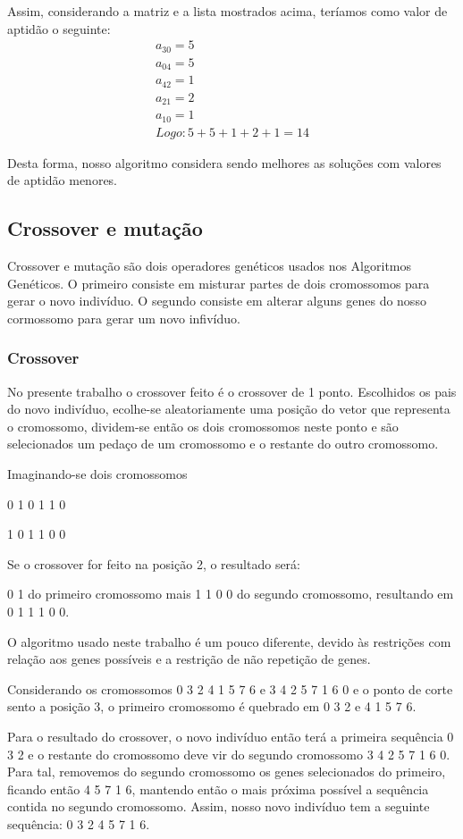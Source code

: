 \documentclass[a4paper,12pt]{article}
\begin{document}
  Assim, considerando a matriz e a lista mostrados acima, teríamos como valor de
  aptidão o seguinte:
  \begin{align*}
    a_{30}=5 \\
    a_{04}=5 \\
    a_{42}=1 \\
    a_{21}=2 \\
    a_{10}=1 \\
    Logo: 5+5+1+2+1 = 14
  \end{align*}

  Desta forma, nosso algoritmo considera sendo melhores as soluções com valores
  de aptidão menores.

  \subsection{Crossover e mutação}
  Crossover e mutação são dois operadores genéticos usados nos Algoritmos
  Genéticos. O primeiro consiste em misturar partes de dois cromossomos para
  gerar o novo indivíduo. O segundo consiste em alterar alguns genes do nosso
  cormossomo para gerar um novo infivíduo.

  \subsubsection{Crossover}
  No presente trabalho o crossover feito é o crossover de 1 ponto.
  Escolhidos os pais do novo indivíduo, ecolhe-se aleatoriamente uma posição do
  vetor que representa o cromossomo, dividem-se então os dois cromossomos neste
  ponto e são selecionados um pedaço de um cromossomo e o restante do outro
  cromossomo.

  Imaginando-se dois cromossomos

  0 1 0 1 1 0

  1 0 1 1 0 0

  Se o crossover for feito na posição 2, o resultado será:

  0 1 do primeiro cromossomo mais 1 1 0 0 do segundo cromossomo, resultando
  em 0 1 1 1 0 0.

  O algoritmo usado neste trabalho é um pouco diferente, devido às restrições com relação aos genes
  possíveis e a restrição de não repetição de genes.

  Considerando os cromossomos 0 3 2 4 1 5 7 6 e 3 4 2 5 7 1 6 0 e o ponto de
  corte sento a posição 3, o primeiro cromossomo é quebrado em 0 3 2 e
  4 1 5 7 6.

  Para o resultado do crossover, o novo indivíduo então terá a primeira
  sequência 0 3 2 e o restante do cromossomo deve vir do segundo cromossomo
  3 4 2 5 7 1 6 0. Para tal, removemos do segundo cromossomo os genes
  selecionados do primeiro, ficando então 4 5 7 1 6, mantendo então o mais
  próxima possível a sequência contida no segundo cromossomo. Assim, nosso novo
  indivíduo tem a seguinte sequência: 0 3 2 4 5 7 1 6.
\end{document}

